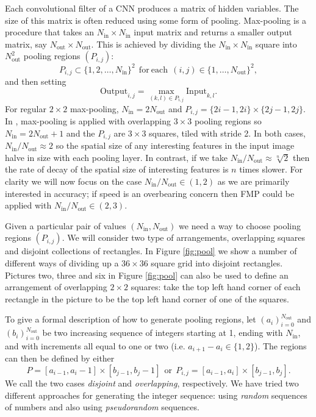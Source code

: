\documentclass[english]{article}
\begin{document}
Each convolutional filter of a CNN produces a matrix of hidden variables.
The size of this matrix is often reduced using some form of pooling.
Max-pooling is a procedure that takes an $N_{\mathrm{in}}\times N_{\mathrm{in}}$
input matrix and returns a smaller output matrix, say $N_{\mathrm{out}}\times N_{\mathrm{out}}$.
This is achieved by dividing the $N_{\mathrm{in}}\times N_{\mathrm{in}}$
square into $N_{\mathrm{out}}^{2}$ pooling regions $(P_{i,j})$:
\[
P_{i,j}\subset\{1,2,\dots,N_{\mathrm{in}}\}^{2}\ \ \mathrm{for}\ \mathrm{each}\ \ (i,j)\in\{1,\dots,N_{\mathrm{out}}\}^{2},
\]
and then setting
\[
\mathrm{Output}_{i,j}=\max_{(k,l)\in P_{i,j}}\mathrm{Input}_{k,l}.
\]
For regular $2\times2$ max-pooling, $N_{\mathrm{in}}=2N_{\mathrm{out}}$
and $P_{i,j}=\{2i-1,2i\}\times\{2j-1,2j\}$. In \cite{conf/nips/KrizhevskySH12},
max-pooling is applied with overlapping $3\times3$ pooling regions
so $N_{\mathrm{in}}=2N_{\mathrm{out}}+1$ and the $P_{i,j}$ are $3\times3$
squares, tiled with stride 2. In both cases, $N_{\mathrm{in}}/N_{\mathrm{out}}\approx2$
so the spatial size of any interesting features in the input image
halve in size with each pooling layer. In contrast, if we take $N_{\mathrm{in}}/N_{\mathrm{out}}\approx\sqrt[n]{2}$
then the rate of decay of the spatial size of interesting features
is $n$ times slower. For clarity we will now focus on the case $N_{\mathrm{in}}/N_{\mathrm{out}}\in(1,2)$
as we are primarily interested in accuracy; if speed is an overbearing
concern then FMP could be applied with $N_{\mathrm{in}}/N_{\mathrm{out}}\in(2,3)$.

Given a particular pair of values $(N_{\mathrm{in}},N_{\mathrm{out}})$
we need a way to choose pooling regions $(P_{i,j})$. We will consider
two type of arrangements, overlapping squares and disjoint collections
of rectangles. In Figure \ref{fig:pool} we show a number of different
ways of dividing up a $36\times36$ square grid into disjoint rectangles.
Pictures two, three and six in Figure \ref{fig:pool} can also be
used to define an arrangement of overlapping $2\times2$ squares:
take the top left hand corner of each rectangle in the picture to
be the top left hand corner of one of the squares.

To give a formal description of how to generate pooling regions, let
$(a_{i})_{i=0}^{N_{\mathrm{out}}}$ and $(b_{i})_{i=0}^{N_{\mathrm{out}}}$
be two increasing sequence of integers starting at 1, ending with
$N_{\mathrm{in}}$, and with increments all equal to one or two (i.e.
$a_{i+1}-a_{i}\in\{1,2\}$). The regions can then be defined by either
\begin{equation}
P=[a_{i-1},a_{i}-1]\times[b_{j-1},b_{j}-1]\ \ \mathrm{or\ }\ P_{i,j}=[a_{i-1},a_{i}]\times[b_{j-1},b_{j}].\label{eq:pool}
\end{equation}
We call the two cases \emph{disjoint} and \emph{overlapping}, respectively.
We have tried two different approaches for generating the integer
sequence: using \emph{random} sequences of numbers and also using
\emph{pseudorandom }sequences.
\end{document}

